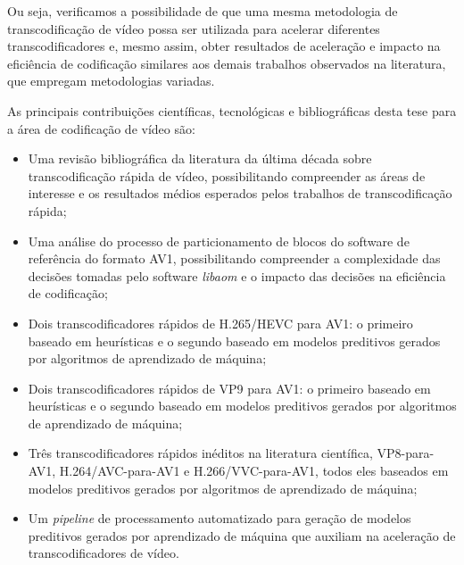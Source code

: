 Ou seja, verificamos a possibilidade de que uma mesma metodologia de transcodificação de vídeo possa ser utilizada para acelerar diferentes transcodificadores e, mesmo assim, obter resultados de aceleração e impacto na eficiência de codificação similares aos demais trabalhos observados na literatura, que empregam metodologias variadas.

As principais contribuições científicas, tecnológicas e bibliográficas desta tese para a área de codificação de vídeo são:

\begin{itemize}
    \item Uma revisão bibliográfica da literatura da última década sobre transcodificação rápida de vídeo, possibilitando compreender as áreas de interesse e os resultados médios esperados pelos trabalhos de transcodificação rápida;

    \item Uma análise do processo de particionamento de blocos do software de referência do formato AV1, possibilitando compreender a complexidade das decisões tomadas pelo software \textit{libaom} e o impacto das decisões na eficiência de codificação;

    \item Dois transcodificadores rápidos de H.265/HEVC para AV1: o primeiro baseado em heurísticas \cite{bib:borges2_2021} e o segundo baseado em modelos preditivos gerados por algoritmos de aprendizado de máquina;

    \item Dois transcodificadores rápidos de VP9 para AV1: o primeiro baseado em heurísticas \cite{bib:borges_2021} e o segundo baseado em modelos preditivos gerados por algoritmos de aprendizado de máquina;

    \item Três transcodificadores rápidos inéditos na literatura científica, VP8-para-AV1, H.264/AVC-para-AV1 e H.266/VVC-para-AV1, todos eles baseados em modelos preditivos gerados por algoritmos de aprendizado de máquina;

    \item Um \textit{pipeline} de processamento automatizado para geração de modelos preditivos gerados por aprendizado de máquina que auxiliam na aceleração de transcodificadores de vídeo.
\end{itemize}


